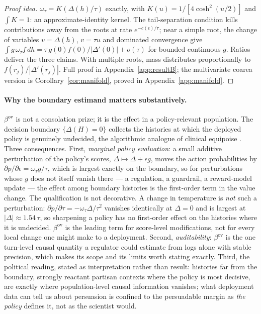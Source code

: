\documentclass[11pt]{article}
\theoremstyle{definition}
\theoremstyle{remark}
\newcommand{\ov}{\mathrm{ov}}
\begin{document}
\begin{proof}[Proof idea]
$\omega_\tau = K(\Delta(h)/\tau)$ exactly, with $K(u) =
1/[4\cosh^2(u/2)]$ and $\int K = 1$: an approximate-identity kernel. The
tail-separation condition kills contributions away from the roots at rate
$e^{-c(\epsilon)/\tau}$; near a simple root, the change of variables
$v=\Delta(h)$, $v=\tau u$ and dominated convergence give
$\int g\,\omega_\tau f \,dh = \tau\, g(0) f(0)/|\Delta'(0)| + o(\tau)$ for
bounded continuous $g$. Ratios deliver the three claims. With multiple roots,
mass distributes proportionally to $f(r_j)/|\Delta'(r_j)|$. Full proof in
Appendix~\ref{app:resultB}; the multivariate coarea version is
Corollary~\ref{cor:manifold}, proved in Appendix~\ref{app:manifold}.
\end{proof}

\paragraph{Why the boundary estimand matters substantively.} $\beta^{\ov}$
is not a consolation prize; it is the effect in a policy-relevant population.
The decision boundary $\{\Delta(H) = 0\}$ collects the histories at which the
deployed policy is genuinely undecided, the algorithmic analogue of
clinical equipoise \citep{li2018balancing}. Three consequences. First,
\emph{marginal policy evaluation}: a small additive perturbation of the
policy's scores, $\Delta \mapsto \Delta + \epsilon g$, moves the action
probabilities by $\partial p/\partial\epsilon = \omega_\tau g/\tau$, which is
largest exactly on the boundary, so for perturbations whose $g$ does not
itself vanish there --- a regulation, a guardrail, a reward-model update ---
the effect among boundary histories is the first-order term in the value
change. The qualification is not decorative. A change in temperature is
\emph{not} such a perturbation: $\partial p/\partial\tau = -\omega_\tau
\Delta/\tau^{2}$ vanishes identically at $\Delta = 0$ and is largest at
$|\Delta| \approx 1.54\,\tau$, so sharpening a policy has no first-order
effect on the histories where it is undecided. $\beta^{\ov}$ is the leading
term for score-level modifications, not for every local change one might
make to a deployment. Second, \emph{auditability}: $\beta^{\ov}$ is the one
turn-level causal quantity a regulator could estimate from logs alone with
stable precision, which makes its scope and its limits worth stating exactly.
Third, the political reading, stated as interpretation rather than result:
histories far from the boundary, strongly reactant partisan contexts where
the policy is most decisive, are exactly where population-level causal
information vanishes; what deployment data can tell us about persuasion is
confined to the persuadable margin as \emph{the policy} defines it, not as
the scientist would.
\end{document}
